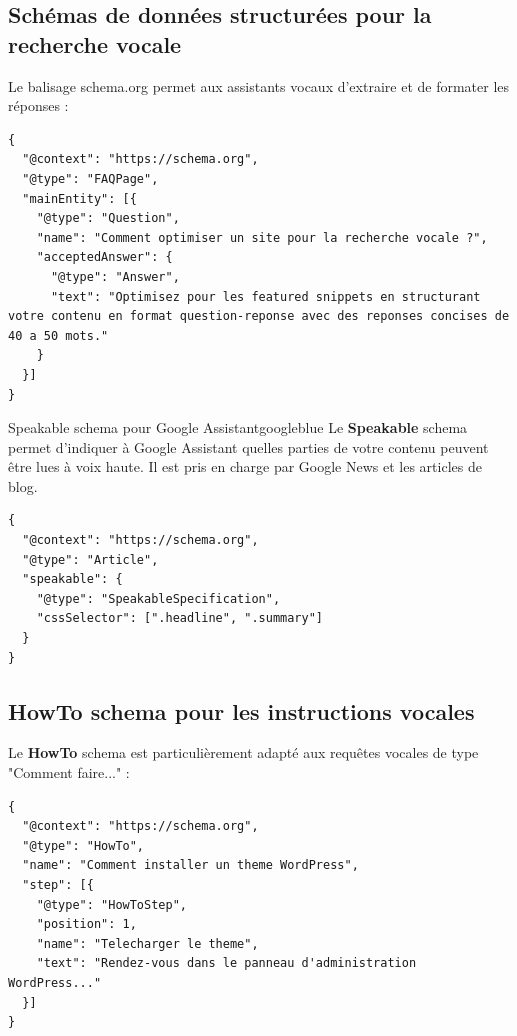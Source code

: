 \documentclass[12pt,a4paper,twoside]{report}
\newcommand{\keyword}[1]{\textbf{\textcolor{googleblue}{#1}}}
\begin{document}
\subsection{Schémas de données structurées pour la recherche vocale}

Le balisage schema.org permet aux assistants vocaux d'extraire et de formater les réponses :

\begin{lstlisting}[style=htmlcode,caption={FAQPage schema pour les questions fréquentes}]
{
  "@context": "https://schema.org",
  "@type": "FAQPage",
  "mainEntity": [{
    "@type": "Question",
    "name": "Comment optimiser un site pour la recherche vocale ?",
    "acceptedAnswer": {
      "@type": "Answer",
      "text": "Optimisez pour les featured snippets en structurant votre contenu en format question-reponse avec des reponses concises de 40 a 50 mots."
    }
  }]
}
\end{lstlisting}

\begin{mybox}{Speakable schema pour Google Assistant}{googleblue}
Le \keyword{Speakable} schema permet d'indiquer à Google Assistant quelles parties de votre contenu peuvent être lues à voix haute. Il est pris en charge par Google News et les articles de blog.

\begin{lstlisting}[style=htmlcode]
{
  "@context": "https://schema.org",
  "@type": "Article",
  "speakable": {
    "@type": "SpeakableSpecification",
    "cssSelector": [".headline", ".summary"]
  }
}
\end{lstlisting}
\end{mybox}

\subsection{HowTo schema pour les instructions vocales}

Le \keyword{HowTo} schema est particulièrement adapté aux requêtes vocales de type "Comment faire..." :

\begin{lstlisting}[style=htmlcode,caption={HowTo schema pour tutoriels vocaux}]
{
  "@context": "https://schema.org",
  "@type": "HowTo",
  "name": "Comment installer un theme WordPress",
  "step": [{
    "@type": "HowToStep",
    "position": 1,
    "name": "Telecharger le theme",
    "text": "Rendez-vous dans le panneau d'administration WordPress..."
  }]
}
\end{lstlisting}
\end{document}
